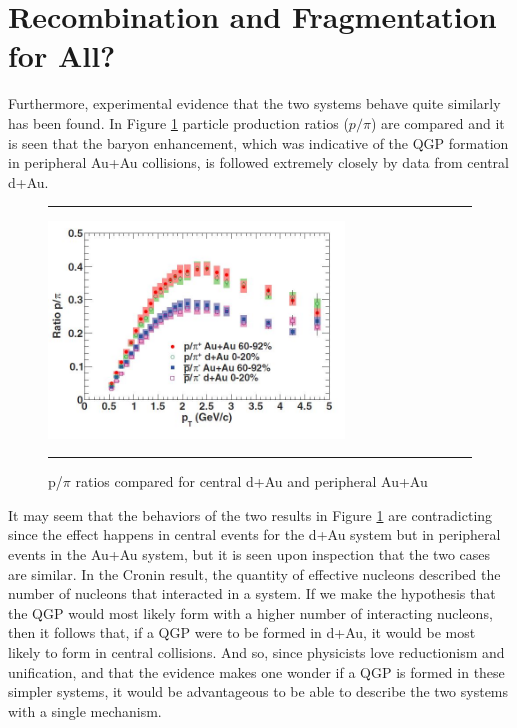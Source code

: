 \section{Recombination and Fragmentation for All?}
\label{sect:recombcold}
Furthermore, experimental evidence that the two systems behave quite similarly has been found. In Figure \ref{fig:daaaratios} particle production ratios ($p/\pi$) are compared and it is seen that the baryon enhancement, which was indicative of the QGP formation in peripheral Au+Au collisions, is followed extremely closely by data from central d+Au. 

\begin{figure}[htbp!]
  \centering    \rule{35em}{0.5pt}
    \includegraphics[width=0.7\textwidth]{prevplots/dAvsAAratios.JPG}

  \caption[p/$\pi$ ratios compared for central d+Au and peripheral Au+Au]{p/$\pi$ ratios compared for central d+Au and peripheral Au+Au\citep{PhysRevC.88.024906}}
  \label{fig:daaaratios}    \rule{35em}{0.5pt}
\end{figure} 

It may seem that the behaviors of the two results in Figure \ref{fig:daaaratios} are contradicting since the effect happens in central events for the d+Au system but in peripheral events in the Au+Au system, but it is seen upon inspection that the two cases are similar. In the Cronin result, the quantity of effective nucleons described the number of nucleons that interacted in a system. If we make the hypothesis that the QGP would most likely form with a higher number of interacting nucleons, then it follows that, if a QGP were to be formed in d+Au, it would be most likely to form in central collisions. And so, since physicists love reductionism and unification, and that the evidence makes one wonder if a QGP is formed in these simpler systems, it would be advantageous to be able to describe the two systems with a single mechanism.

